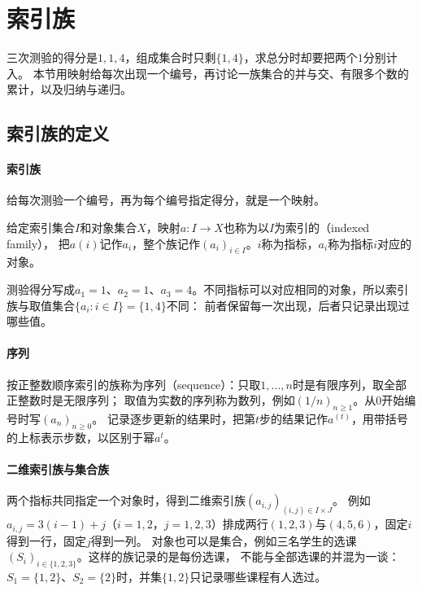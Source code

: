 \section{索引族}
\label{sec:prelim-indices-sums-recurrences}

三次测验的得分是$1,1,4$，组成集合时只剩$\{1,4\}$，求总分时却要把两个$1$分别计入。
本节用映射给每次出现一个编号，再讨论一族集合的并与交、有限多个数的累计，以及归纳与递归。

\subsection{索引族的定义}
\label{sec:prelim-indexed-sequences}

\paragraph{索引族}
给每次测验一个编号，再为每个编号指定得分，就是一个映射。
\begin{definition}[索引族]
\label{def:prelim-indexed-family}
给定索引集合$I$和对象集合$X$，映射$a:I\to X$也称为以$I$为索引的（indexed family），
把$a(i)$记作$a_i$，整个族记作$(a_i)_{i\in I}$。$i$称为指标，$a_i$称为指标$i$对应的对象。
\end{definition}
测验得分写成$a_1=1$、$a_2=1$、$a_3=4$。不同指标可以对应相同的对象，所以索引族与取值集合$\{a_i:i\in I\}=\{1,4\}$不同：
前者保留每一次出现，后者只记录出现过哪些值。

\paragraph{序列}
按正整数顺序索引的族称为序列（sequence）：只取$1,\ldots,n$时是有限序列，取全部正整数时是无限序列；
取值为实数的序列称为数列，例如$(1/n)_{n\geq1}$。从$0$开始编号时写$(a_n)_{n\geq0}$。
记录逐步更新的结果时，把第$t$步的结果记作$a^{(t)}$，用带括号的上标表示步数，以区别于幂$a^t$。

\paragraph{二维索引族与集合族}
两个指标共同指定一个对象时，得到二维索引族$(a_{i,j})_{(i,j)\in I\times J}$。
例如$a_{i,j}=3(i-1)+j$（$i=1,2$，$j=1,2,3$）排成两行$(1,2,3)$与$(4,5,6)$，固定$i$得到一行，固定$j$得到一列。
对象也可以是集合，例如三名学生的选课$(S_i)_{i\in\{1,2,3\}}$。这样的族记录的是每份选课，
不能与全部选课的并混为一谈：$S_1=\{1,2\}$、$S_2=\{2\}$时，并集$\{1,2\}$只记录哪些课程有人选过。

